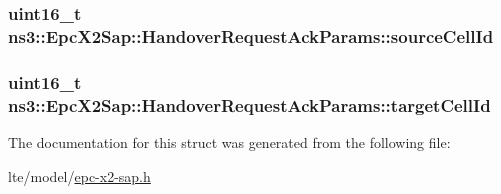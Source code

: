 \subsubsection[{\texorpdfstring{source\+Cell\+Id}{sourceCellId}}]{\setlength{\rightskip}{0pt plus 5cm}uint16\+\_\+t ns3\+::\+Epc\+X2\+Sap\+::\+Handover\+Request\+Ack\+Params\+::source\+Cell\+Id}\hypertarget{structns3_1_1EpcX2Sap_1_1HandoverRequestAckParams_a2e1cb3aafe8340681bcf081203999a79}{}\label{structns3_1_1EpcX2Sap_1_1HandoverRequestAckParams_a2e1cb3aafe8340681bcf081203999a79}
\subsubsection[{\texorpdfstring{target\+Cell\+Id}{targetCellId}}]{\setlength{\rightskip}{0pt plus 5cm}uint16\+\_\+t ns3\+::\+Epc\+X2\+Sap\+::\+Handover\+Request\+Ack\+Params\+::target\+Cell\+Id}\hypertarget{structns3_1_1EpcX2Sap_1_1HandoverRequestAckParams_a6a9aedc6c364d4f14d01c6bf22423f15}{}\label{structns3_1_1EpcX2Sap_1_1HandoverRequestAckParams_a6a9aedc6c364d4f14d01c6bf22423f15}


The documentation for this struct was generated from the following file\+:\begin{DoxyCompactItemize}
\item 
lte/model/\hyperlink{epc-x2-sap_8h}{epc-\/x2-\/sap.\+h}\end{DoxyCompactItemize}
